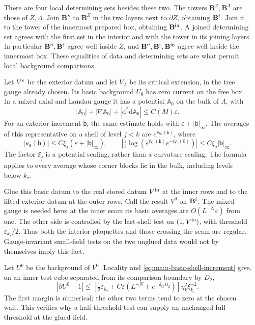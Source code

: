 \documentclass[11pt,letterpaper,reqno]{amsart}
\theoremstyle{definition}
\theoremstyle{remark}
\begin{document}
There are four local determining sets besides these two.
The towers \(\mathbf B^Z,\mathbf B^\Lambda\) are those of
\(Z,\Lambda\). Join \(\mathbf B''\) to \(\mathbf B^Z\) in the
two layers next to \(\partial Z\), obtaining \(\mathbf B^{\rm f}\).
Join it to the tower of the innermost prepared box, obtaining
\(\mathbf B^{\rm in}\). A joined determining set agrees with
the first set in the interior and with the tower in its joining
layers. In particular \(\mathbf B'',\mathbf B^{\rm f}\) agree
well inside \(Z\), and
\(\mathbf B'',\mathbf B^{\rm f},\mathbf B^{\rm in}\) agree
well inside the innermost box. These equalities of data and
determining sets are what permit local background comparisons.

Let \(V^{\rm e}\) be the exterior datum and let \(V_\Lambda\)
be its critical extension, in the tree gauge already chosen.
Its basic background \(U_0\) has zero current on the free
box. In a mixed axial and Landau gauge it has a potential
\(\mathbb A_0\) on the bulk of \(\Lambda\), with
\[
 |\mathbb A_0|+|\nabla\mathbb A_0|
              +|\mathrm d^*\mathrm d\mathbb A_0|\le C(M)\varepsilon.
\]
For an exterior increment \(\mathsf b\), the same estimate
holds with \(\varepsilon+|\mathsf b|_\infty\).
The averages of this representative on a shell of level
\(j<k\) are \(e^{i\mathsf v_0(\mathsf b)}\), where
\begin{equation}\label{eq:main-basic-shell-increment}
 |\mathsf v_0(\mathsf b)|\le
          C\xi_j(\varepsilon+|\mathsf b|_\infty),\qquad
 \left|\tfrac1i\log
       (e^{i\mathsf v_0(\mathsf b)}e^{-i\mathsf v_0(0)})\right|
          \le C\xi_j|\mathsf b|_\infty .
\end{equation}
The factor \(\xi_j\) is a potential scaling, rather than a
curvature scaling. The formula applies to every average whose
corner blocks lie in the bulk, including levels below \(k_\flat\).

Glue this basic datum to the real stored datum \(V^{\rm in}\)
at the inner rows and to the lifted exterior datum at the outer
rows. Call the result \(V^0\) on \(\mathbf B^{\rm f}\).
The mixed gauge is needed here: at the inner seam its basic
averages are \(O(L^{-N}\varepsilon)\) from one. The other
side is controlled by the last-shell test on
\((1,V^{\rm in})\), with threshold \(\varepsilon_{k_\flat}/2\).
Thus both the interior plaquettes and those crossing the seam
are regular. Gauge-invariant small-field tests on the two
unglued data would not by themselves imply this fact.

Let \(U^0\) be the background of \(V^0\). Locality and
\eqref{eq:main-basic-shell-increment} give, on an inner
test cube separated from its comparison boundary by \(D_2\),
\begin{equation}\label{eq:main-last-shell-transfer}
 |\partial U^0-1|
 \le\left[\tfrac12\varepsilon_{k_\flat}
          +C\varepsilon(L^{-N}+e^{-\delta_{\mathrm G}D_2})\right]
                                      \eta_k^2\xi_{k_\flat}^{-2}.
\end{equation}
The first margin is numerical; the other two terms tend to
zero at the chosen wait. This verifies why a half-threshold
test can supply an unchanged full threshold at the glued field.
\end{document}
